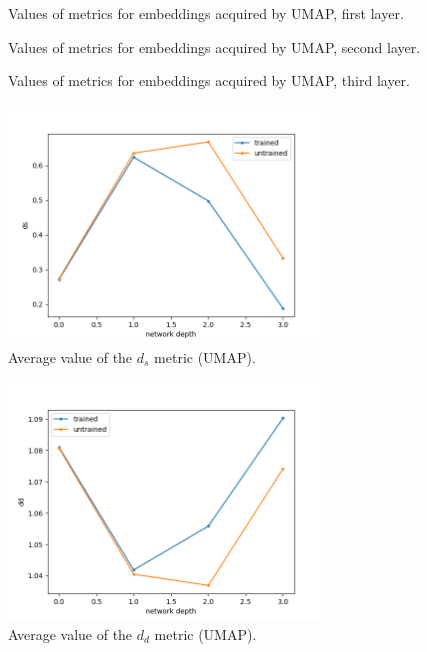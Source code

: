 \documentclass{article}
\begin{document}
\begin{figure}
  \centering
    \resizebox{\textwidth}{!}{
        
    }
    \caption{Values of metrics for embeddings acquired by UMAP, first layer.}
\end{figure}

\begin{figure}
  \centering
    \resizebox{\textwidth}{!}{
        
    }
    \caption{Values of metrics for embeddings acquired by UMAP, second layer.}
\end{figure}

\begin{figure}
  \centering
    \resizebox{\textwidth}{!}{
        
    }
    \caption{Values of metrics for embeddings acquired by UMAP, third layer.}
\end{figure}

\begin{figure}
  \centering
    \includegraphics[width=0.75\textwidth]{../../out/activations_cnn/fmnist/umap/plot_metric_ds.png}
    \caption{Average value of the \(d_s\) metric (UMAP).}
\end{figure}

\begin{figure}
  \centering
    \includegraphics[width=0.75\textwidth]{../../out/activations_cnn/fmnist/umap/plot_metric_dd.png}
    \caption{Average value of the \(d_d\) metric (UMAP).}
\end{figure}
\end{document}
